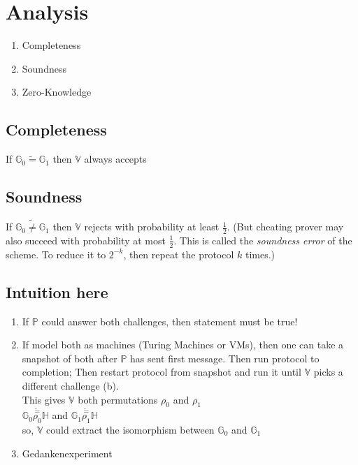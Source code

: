 \documentclass{report}
\begin{document}
 
	\section{Analysis}
	\sectionstart
		\begin{enumerate}
			\item Completeness
			\item Soundness
			\item Zero-Knowledge
		\end{enumerate}
		\subsection{Completeness}
		\subsectionstart
			If $\mathbb{G}_0 \tilde{=} \mathbb{G}_1$ then $\mathbb{V}$ always accepts
		\sectionend
		\subsection{Soundness}
		\subsectionstart
			If $\mathbb{G}_0 \tilde{\neq} \mathbb{G}_1$ then $\mathbb{V}$ rejects with probability at least $\frac{1}{2}$. (But cheating prover may also succeed with probability at most $\frac{1}{2}$. This is called the \textit{soundness error} of the scheme. To reduce it to $2^{-k}$, then repeat the protocol $k$ times.)
		\sectionend
		\subsection{Intuition here}
		\subsectionstart
			\begin{enumerate}[-]
				\item If $\mathbb{P}$ could answer both challenges, then statement must be true!
				\item If model both as machines (Turing Machines or VMs), then one can take a snapshot of both after $\mathbb{P}$ has sent first message. Then run protocol to completion; Then restart protocol from snapshot and run it until $\mathbb{V}$ picks a different challenge (b). \\
				This gives $\mathbb{V}$ both permutations $\rho _0$ and $\rho _1$ \\
				$\mathbb{G}_0 \stackrel{\tilde{=}}{\rho _0} \mathbb{H}$ and $\mathbb{G}_1 \stackrel{\tilde{=}}{\rho _1} \mathbb{H}$ \\
				so, $\mathbb{V}$ could extract the isomorphism between $\mathbb{G}_0$ and $\mathbb{G}_1$
				\item Gedankenexperiment
			\end{enumerate}
		\sectionend
\end{document}
